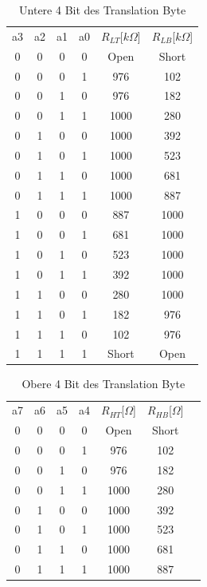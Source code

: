 \begin{table}[!ht]
\caption{Untere 4 Bit des Translation Byte}
\label{TranslationByte_Lower}
\centering
\begin{tabular}{c|c|c|c|c|c}
 a3 & a2 & a1 & a0 & $R_{LT}$[$k\Omega$] & $R_{LB}$[$k\Omega$]\\
 0 & 0 & 0 & 0 & Open & Short \\ 
 0 & 0 & 0 & 1 & 976 & 102\\ 
 0 & 0 & 1 & 0 & 976 & 182\\
 0 & 0 & 1 & 1 & 1000 & 280\\ 
 0 & 1 & 0 & 0 & 1000 & 392\\ 
 0 & 1 & 0 & 1 & 1000 & 523\\ 
 0 & 1 & 1 & 0 & 1000 & 681\\ 
 0 & 1 & 1 & 1 & 1000 & 887\\
 1 & 0 & 0 & 0 & 887 & 1000 \\ 
 1 & 0 & 0 & 1 & 681 & 1000\\ 
 1 & 0 & 1 & 0 & 523 & 1000\\
 1 & 0 & 1 & 1 & 392 & 1000\\ 
 1 & 1 & 0 & 0 & 280 & 1000\\ 
 1 & 1 & 0 & 1 & 182 & 976 \\ 
 1 & 1 & 1 & 0 & 102 & 976\\ 
 1 & 1 & 1 & 1 & Short & Open\\
\end{tabular}
\end{table}

\begin{table}[H]
\caption{Obere 4 Bit des Translation Byte}
\label{TranslationByte_Upper}
\centering
\begin{tabular}{c|c|c|c|c|c|c}
 a7 & a6 & a5 & a4 & $R_{HT}$[$\Omega$] & $R_{HB}$[$\Omega$]\\
 0 & 0 & 0 & 0 & Open & Short \\ 
 0 & 0 & 0 & 1 & 976 & 102\\ 
 0 & 0 & 1 & 0 & 976 & 182\\
 0 & 0 & 1 & 1 & 1000 & 280\\ 
 0 & 1 & 0 & 0 & 1000 & 392\\ 
 0 & 1 & 0 & 1 & 1000 & 523\\ 
 0 & 1 & 1 & 0 & 1000 & 681\\ 
 0 & 1 & 1 & 1 & 1000 & 887\\

\end{tabular}
\end{table}

